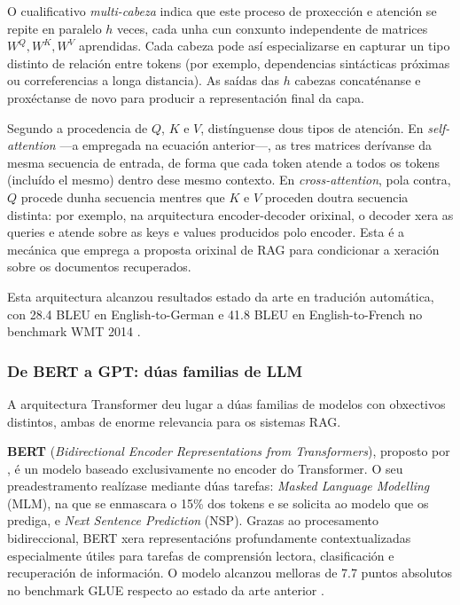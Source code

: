 \documentclass[11pt, a4paper, oneside]{report}
\begin{document}
O cualificativo \textit{multi-cabeza} indica que este proceso de proxección e
atención se repite en paralelo $h$ veces, cada unha cun conxunto independente de
matrices $W^Q, W^K, W^V$ aprendidas. Cada cabeza pode así especializarse en capturar
un tipo distinto de relación entre tokens (por exemplo, dependencias sintácticas
próximas ou correferencias a longa distancia). As saídas das $h$ cabezas
concaténanse e proxéctanse de novo para producir a representación final da capa.

Segundo a procedencia de $Q$, $K$ e $V$, distínguense dous tipos de atención. En
\textit{self-attention} —a empregada na ecuación anterior—, as tres matrices
derívanse da mesma secuencia de entrada, de forma que cada token atende a todos os
tokens (incluído el mesmo) dentro dese mesmo contexto. En \textit{cross-attention},
pola contra, $Q$ procede dunha secuencia mentres que $K$ e $V$ proceden doutra
secuencia distinta: por exemplo, na arquitectura encoder-decoder orixinal, o decoder
xera as queries e atende sobre as keys e values producidos polo encoder. Esta é a
mecánica que emprega a proposta orixinal de RAG \citep{lewis2020retrieval} para
condicionar a xeración sobre os documentos recuperados.

Esta arquitectura alcanzou resultados estado da arte en tradución automática, con
28.4 BLEU en English-to-German e 41.8 BLEU en English-to-French no benchmark WMT 2014
\citep{vaswani2017attention}.

\subsubsection{De BERT a GPT: dúas familias de LLM}
\label{sec:bert_gpt}

A arquitectura Transformer deu lugar a dúas familias de modelos con obxectivos distintos,
ambas de enorme relevancia para os sistemas RAG.

\textbf{BERT} (\textit{Bidirectional Encoder Representations from Transformers}),
proposto por \citet{devlin2019bert}, é un modelo baseado exclusivamente no encoder do
Transformer. O seu preadestramento realízase mediante dúas tarefas: \textit{Masked
Language Modelling} (MLM), na que se enmascara o 15\% dos tokens e se solicita ao
modelo que os prediga, e \textit{Next Sentence Prediction} (NSP). Grazas ao
procesamento bidireccional, BERT xera representacións profundamente contextualizadas
especialmente útiles para tarefas de comprensión lectora, clasificación e recuperación
de información. O modelo alcanzou melloras de 7.7 puntos absolutos no benchmark GLUE
respecto ao estado da arte anterior \citep{devlin2019bert}.
\end{document}
